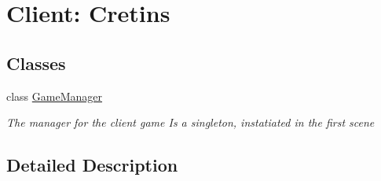 \hypertarget{group__client}{\section{Client\-: Cretins}
\label{group__client}
}
\subsection*{Classes}
\begin{DoxyCompactItemize}
\item 
class \hyperlink{class_game_manager}{Game\-Manager}
\begin{DoxyCompactList}\small\item\em The manager for the client game Is a singleton, instatiated in the first scene \end{DoxyCompactList}\end{DoxyCompactItemize}


\subsection{Detailed Description}
